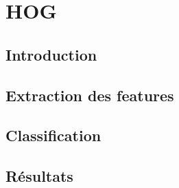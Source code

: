 
\chapter{HOG}

\section{Introduction}

\section{Extraction des features}

\section{Classification}

\section{Résultats}
